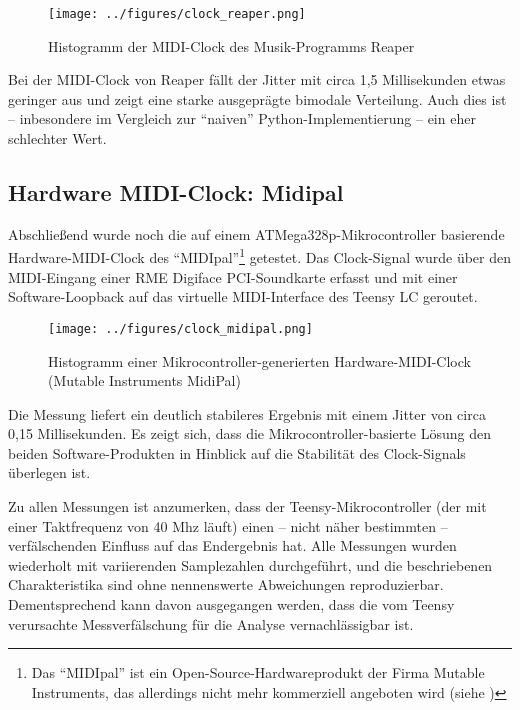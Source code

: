 \begin{figure}[H]
	\centering
	\captionsetup{justification=centering,margin=2cm}
		\texttt{[image: ../figures/clock\_reaper.png]}
		\caption[Histogramm der MIDI-Clock des Musik-Programms Reaper]{Histogramm der MIDI-Clock des Musik-Programms Reaper}
	\label{fig:ice40_pmod_pins}
\end{figure}

Bei der MIDI-Clock von Reaper fällt der Jitter mit circa 1,5 Millisekunden etwas geringer aus und zeigt eine starke ausgeprägte bimodale Verteilung. Auch dies ist -- inbesondere im Vergleich zur ``naiven'' Python-Implementierung -- ein eher schlechter Wert.

\subsection{Hardware MIDI-Clock: Midipal}
Abschließend wurde noch die auf einem ATMega328p-Mikrocontroller basierende Hardware-MIDI-Clock des ``MIDIpal''\footnote{Das ``MIDIpal'' ist ein Open-Source-Hardwareprodukt der Firma Mutable Instruments, das allerdings nicht mehr kommerziell angeboten wird (siehe \cite{web:midipal})} getestet. Das Clock-Signal wurde über den MIDI-Eingang einer RME Digiface PCI-Soundkarte erfasst und mit einer Software-Loopback auf das virtuelle MIDI-Interface des Teensy LC geroutet.

\begin{figure}[H]
	\centering
	\captionsetup{justification=centering,margin=2cm}
		\texttt{[image: ../figures/clock\_midipal.png]}
		\caption[Histogramm einer Mikrocontroller-generierten Hardware-MIDI-Clock]{Histogramm einer Mikrocontroller-generierten Hardware-MIDI-Clock (Mutable Instruments MidiPal)}
	\label{fig:ice40_pmod_pins}
\end{figure}

Die Messung liefert ein deutlich stabileres Ergebnis mit einem Jitter von circa 0,15 Millisekunden. Es zeigt sich, dass die Mikrocontroller-basierte Lösung den beiden Software-Produkten in Hinblick auf die Stabilität des Clock-Signals überlegen ist.

Zu allen Messungen ist anzumerken, dass der Teensy-Mikrocontroller (der mit einer Taktfrequenz von 40 Mhz läuft) einen -- nicht näher bestimmten -- verfälschenden Einfluss auf das Endergebnis hat. Alle Messungen wurden wiederholt mit variierenden Samplezahlen durchgeführt, und die beschriebenen Charakteristika sind ohne nennenswerte Abweichungen reproduzierbar. Dementsprechend kann davon ausgegangen werden, dass die vom Teensy verursachte Messverfälschung für die Analyse vernachlässigbar ist.



